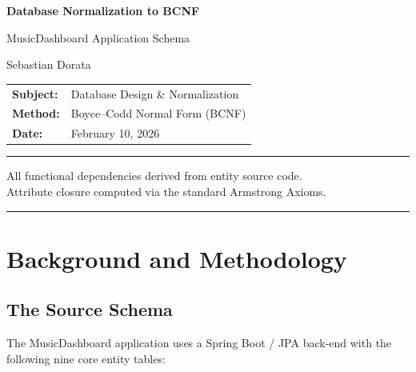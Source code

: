 \documentclass[12pt, a4paper]{article}
\begin{document}
\begin{titlepage}
\centering
\vspace*{2cm}
{\LARGE\bfseries Database Normalization to BCNF\par}
\vspace{0.5cm}
{\Large MusicDashboard Application Schema\par}
\vspace{2cm}
{\large Sebastian Dorata\par}
\vspace{0.3cm}
\vspace{1.5cm}
\begin{tabular}{ll}
    \textbf{Subject:}  & Database Design \& Normalization \\[4pt]
    \textbf{Method:}   & Boyce--Codd Normal Form (BCNF) \\[4pt]
    \textbf{Date:}     & February 10, 2026 \\
\end{tabular}
\vspace{1.5cm}

\hrule
\vspace{0.4cm}
{\small All functional dependencies derived from entity source code.\\
Attribute closure computed via the standard Armstrong Axioms.}
\vspace{0.4cm}
\hrule
\end{titlepage}

\tableofcontents
\newpage

\section{Background and Methodology}

\subsection{The Source Schema}

The MusicDashboard application uses a Spring Boot / JPA back-end with the following
nine core entity tables:
\end{document}
